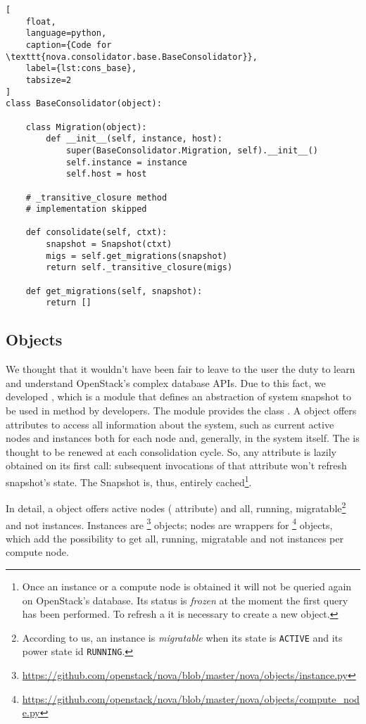\begin{lstlisting}[
	float,
	language=python,
	caption={Code for \texttt{nova.consolidator.base.BaseConsolidator}},
	label={lst:cons_base},
	tabsize=2
]
class BaseConsolidator(object):

	class Migration(object):
		def __init__(self, instance, host):
			super(BaseConsolidator.Migration, self).__init__()
			self.instance = instance
			self.host = host

	# _transitive_closure method
	# implementation skipped

	def consolidate(self, ctxt):
		snapshot = Snapshot(ctxt)
		migs = self.get_migrations(snapshot)
		return self._transitive_closure(migs)

	def get_migrations(self, snapshot):
		return []
\end{lstlisting}

\subsection{Objects}
\label{sub:cons_obj}
We thought that it wouldn't have been fair to leave to the user the duty to learn and understand OpenStack's complex database APIs.
Due to this fact, we developed , which is a module that defines an abstraction of system snapshot to be used in method  by developers. The module provides the class . A  object offers attributes to access all information about the system, such as current active nodes and instances both for each node and, generally, in the system itself. The  is thought to be renewed at each consolidation cycle. So, any attribute is lazily obtained on its first call: subsequent invocations of that attribute won't refresh snapshot's state. The Snapshot is, thus, entirely cached\footnote{Once an instance or a compute node is obtained it will not be queried again on OpenStack's database. Its status is \emph{frozen} at the moment the first query has been performed. To refresh a  it is necessary to create a new  object.}.

In detail, a  object offers active nodes ( attribute) and all, running, migratable\footnote{According to us, an instance is \emph{migratable} when its state is \texttt{ACTIVE} and its power state id \texttt{RUNNING}.} and not instances. Instances are \footnote{\url{https://github.com/openstack/nova/blob/master/nova/objects/instance.py}} objects; nodes are wrappers for \footnote{\url{https://github.com/openstack/nova/blob/master/nova/objects/compute_node.py}} objects, which add the possibility to get all, running, migratable and not instances per compute node.


